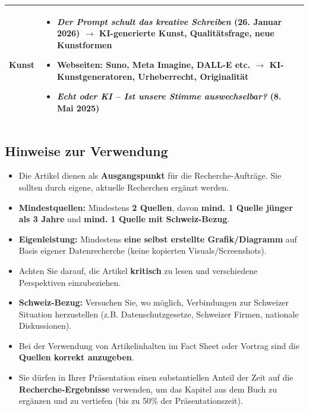 \begin{longtable}{@{}lp{14cm}@{}}
	\textbf{Kunst} & 
	\begin{itemize}[leftmargin=*,noitemsep,topsep=0pt]
		\item[\faFilePdf{}] \textit{Der Prompt schult das kreative Schreiben} (26. Januar 2026) \newline
		$\rightarrow$ KI-generierte Kunst, Qualitätsfrage, neue Kunstformen
		\item[\faSafari] Webseiten: Suno, Meta Imagine, DALL-E etc. \newline
		$\rightarrow$ KI-Kunstgeneratoren, Urheberrecht, Originalität
		\item[\faPlayCircle{}] \textit{Echt oder KI -- Ist unsere Stimme auswechselbar?} (8. Mai 2025) \href{https://www.srf.ch/play/tv/einstein/video/echt-oder-ki-ist-unsere-stimme-auswechselbar?urn=urn:srf:video:e7fc0175-a736-4e9e-8e98-f27f231175c4}{\faLink}
	\end{itemize} \\
	
	\bottomrule
\end{longtable}

\normalsize
\newpage
\subsection*{Hinweise zur Verwendung}

\begin{itemize}
	\item Die Artikel dienen als \textbf{Ausgangspunkt} für die Recherche-Aufträge. Sie sollten durch eigene, aktuelle Recherchen ergänzt werden.
	\item \textbf{Mindestquellen:} Mindestens \textbf{2 Quellen}, davon \textbf{mind. 1 Quelle jünger als 3 Jahre} und \textbf{mind. 1 Quelle mit Schweiz-Bezug}.
	\item \textbf{Eigenleistung:} Mindestens \textbf{eine selbst erstellte Grafik/Diagramm} auf Basis eigener Datenrecherche (keine kopierten Visuals/Screenshots).
	\item Achten Sie darauf, die Artikel \textbf{kritisch} zu lesen und verschiedene Perspektiven einzubeziehen.
	\item \textbf{Schweiz-Bezug:} Versuchen Sie, wo möglich, Verbindungen zur Schweizer Situation herzustellen (z.B. Datenschutzgesetze, Schweizer Firmen, nationale Diskussionen).
	\item Bei der Verwendung von Artikelinhalten im Fact Sheet oder Vortrag sind die \textbf{Quellen korrekt anzugeben}.
	\item Sie dürfen in Ihrer Präsentation einen substantiellen Anteil der Zeit auf die \textbf{Recherche-Ergebnisse} verwenden, um das Kapitel aus dem Buch zu ergänzen und zu vertiefen (bis zu 50\% der Präsentationszeit).
\end{itemize}

